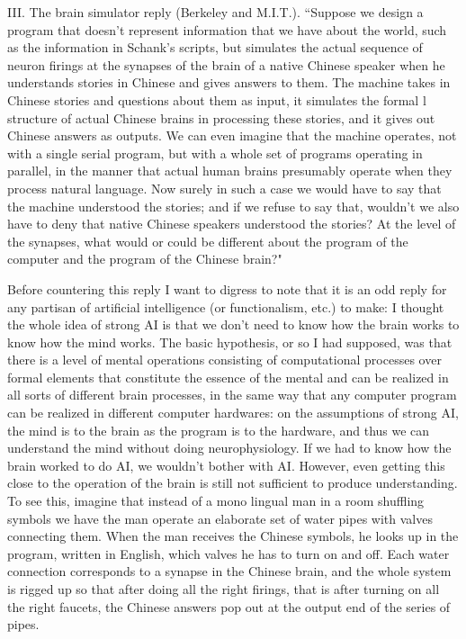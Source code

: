 III. The brain simulator reply (Berkeley and M.I.T.). ``Suppose we design a program that doesn't represent
information that we have about the world, such as the information in Schank's scripts, but simulates the actual
sequence of neuron firings at the synapses of the brain of a native Chinese speaker when he understands stories
in Chinese and gives answers to them. The machine takes in Chinese stories and questions about them as input,
it simulates the formal l structure of actual Chinese brains in processing these stories, and it gives out Chinese
answers as outputs. We can even imagine that the machine operates, not with a single serial program, but with a
whole set of programs operating in parallel, in the manner that actual human brains presumably operate when
they process natural language. Now surely in such a case we would have to say that the machine understood
the stories; and if we refuse to say that, wouldn't we also have to deny that native Chinese speakers understood
the stories? At the level of the synapses, what would or could be different about the program of the computer
and the program of the Chinese brain?"

Before countering this reply I want to digress to note that it is an odd reply for any partisan of artificial
intelligence (or functionalism, etc.) to make: I thought the whole idea of strong AI is that we don't need to know
how the brain works to know how the mind works. The basic hypothesis, or so I had supposed, was that there
is a level of mental operations consisting of computational processes over formal elements that constitute the
essence of the mental and can be realized in all sorts of different brain processes, in the same way that any
computer program can be realized in different computer hardwares: on the assumptions of strong AI, the mind
is to the brain as the program is to the hardware, and thus we can understand the mind without doing
neurophysiology. If we had to know how the brain worked to do AI, we wouldn't bother with AI. However,
even getting this close to the operation of the brain is still not sufficient to produce understanding. To see this,
imagine that instead of a mono lingual man in a room shuffling symbols we have the man operate an elaborate
set of water pipes with valves connecting them. When the man receives the Chinese symbols, he looks up in the
program, written in English, which valves he has to turn on and off. Each water connection corresponds to a
synapse in the Chinese brain, and the whole system is rigged up so that after doing all the right firings, that is
after turning on all the right faucets, the Chinese answers pop out at the output end of the series of pipes.

